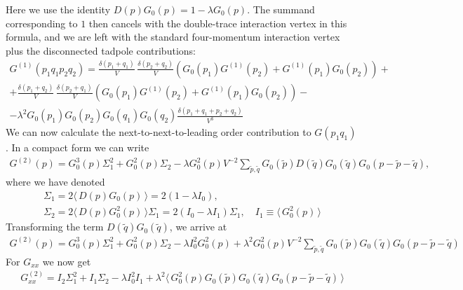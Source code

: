 \documentclass[12pt]{article}
\newcommand{\lr}[1]{ \left( #1 \right) }
\newcommand{\vev}[1]{ \langle \, #1 \, \rangle }
\begin{document}
Here we use the identity $D\lr{p} G_0\lr{p} = 1 - \lambda G_0\lr{p}$. The summand corresponding to $1$ then cancels with the double-trace interaction vertex in this formula, and we are left with the standard four-momentum interaction vertex plus the disconnected tadpole contributions:
\begin{eqnarray}
\label{G4_nlo1}
 G^{\lr{1}}\lr{p_1 q_1 p_2 q_2} =
 \frac{\delta\lr{p_1 + q_1}}{V} \, \frac{\delta\lr{p_2 + q_2}}{V}
 \lr{G_0\lr{p_1} G^{\lr{1}}\lr{p_2} + G^{\lr{1}}\lr{p_1} G_0\lr{p_2} }
 + \nonumber \\ +
 \frac{\delta\lr{p_1 + q_2}}{V} \, \frac{\delta\lr{p_2 + q_1}}{V}
 \lr{G_0\lr{p_1} G^{\lr{1}}\lr{p_2} + G^{\lr{1}}\lr{p_1} G_0\lr{p_2} }
 - \nonumber \\ -
 \lambda^2 G_0\lr{p_1} G_0\lr{p_2} G_0\lr{q_1} G_0\lr{q_2} \frac{\delta\lr{p_1 + q_1 + p_2 + q_2}}{V^3}
\end{eqnarray}
We can now calculate the next-to-next-to-leading order contribution to $G\lr{p_1 q_1}$. In a compact form we can write
\begin{eqnarray}
\label{Gp_nnlo1}
 G^{\lr{2}}\lr{p} = G_0^3\lr{p} \Sigma_1^2 + G_0^2\lr{p} \Sigma_2
 - \lambda G_0^2\lr{p} V^{-2}\sum\limits_{\tilde{p}, \tilde{q}} G_0\lr{\tilde{p}} D\lr{\tilde{q}} G_0\lr{\tilde{q}} G_0\lr{p - \tilde{p} - \tilde{q}} ,
\end{eqnarray}
where we have denoted
\begin{eqnarray}
\label{sigmas_def}
 \Sigma_1 = 2 \vev{D\lr{p} G_0\lr{p}} = 2 \lr{1 - \lambda I_0},
 \nonumber \\
 \Sigma_2 = 2 \vev{D\lr{p} G_0^2\lr{p}} \Sigma_1 = 2 \lr{I_0 - \lambda I_1} \Sigma_1 , \quad I_1 \equiv \vev{G_0^2\lr{p}}
\end{eqnarray}
Transforming the term $D\lr{\tilde{q}} G_0\lr{\tilde{q}}$, we arrive at
\begin{eqnarray}
\label{Gp_nnlo1}
 G^{\lr{2}}\lr{p} = G_0^3\lr{p} \Sigma_1^2 + G_0^2\lr{p} \Sigma_2
 - \lambda I_0^2 G_0^2\lr{p}
  +
  \lambda^2 G_0^2\lr{p} V^{-2}\sum\limits_{\tilde{p}, \tilde{q}} G_0\lr{\tilde{p}} G_0\lr{\tilde{q}} G_0\lr{p - \tilde{p} - \tilde{q}}
\end{eqnarray}
For $G_{xx}$ we now get
\begin{eqnarray}
\label{Gp_nnlo1}
 G_{xx}^{\lr{2}} = I_2 \Sigma_1^2 + I_1 \Sigma_2
 - \lambda I_0^2 I_1
  +
  \lambda^2 \vev{ G_0^2\lr{p} G_0\lr{\tilde{p}} G_0\lr{\tilde{q}} G_0\lr{p - \tilde{p} - \tilde{q}} }
\end{eqnarray}
\end{document}
